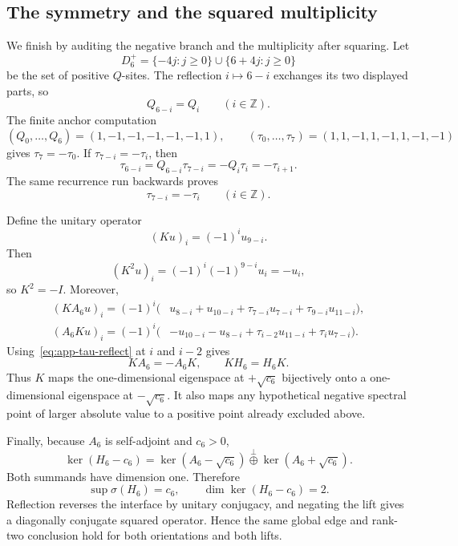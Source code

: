 \subsection{The symmetry and the squared multiplicity}
\label{appsubsec:g6-rank-two}

We finish by auditing the negative branch and the multiplicity after
squaring.  Let
\[
 D_6^{+}=\{-4j:j\geq0\}\cup\{6+4j:j\geq0\}
\]
be the set of positive \(Q\)-sites.  The reflection \(i\mapsto6-i\)
exchanges its two displayed parts, so
\begin{equation}
 Q_{6-i}=Q_i\qquad(i\in\mathbb Z).                    \label{eq:app-Q-reflect}
\end{equation}
The finite anchor computation
\[
 (Q_0,\ldots,Q_6)=(1,-1,-1,-1,-1,-1,1),\qquad
 (\tau_0,\ldots,\tau_7)=(1,1,-1,1,-1,1,-1,-1)
\]
gives \(\tau_7=-\tau_0\).  If \(\tau_{7-i}=-\tau_i\), then
\[
 \tau_{6-i}=Q_{6-i}\tau_{7-i}
 =-Q_i\tau_i=-\tau_{i+1}.
\]
The same recurrence run backwards proves
\begin{equation}
 \tau_{7-i}=-\tau_i\qquad(i\in\mathbb Z).             \label{eq:app-tau-reflect}
\end{equation}

Define the unitary operator
\[
 (Ku)_i=(-1)^iu_{9-i}.
\]
Then
\[
 (K^2u)_i=(-1)^i(-1)^{9-i}u_i=-u_i,
\]
so \(K^2=-I\).  Moreover,
\begin{align*}
(KA_6u)_i=(-1)^i\bigl(&u_{8-i}+u_{10-i}
 +\tau_{7-i}u_{7-i}+\tau_{9-i}u_{11-i}\bigr),\\
(A_6Ku)_i=(-1)^i\bigl(&-u_{10-i}-u_{8-i}
 +\tau_{i-2}u_{11-i}+\tau_i u_{7-i}\bigr).
\end{align*}
Using~\eqref{eq:app-tau-reflect} at \(i\) and \(i-2\) gives
\[
 KA_6=-A_6K,\qquad KH_6=H_6K.                         \label{eq:app-K-relations}
\]
Thus \(K\) maps the one-dimensional eigenspace at \(+\sqrt{c_6}\)
bijectively onto a one-dimensional eigenspace at \(-\sqrt{c_6}\).
It also maps any hypothetical negative spectral point of larger absolute
value to a positive point already excluded above.

Finally, because \(A_6\) is self-adjoint and \(c_6>0\),
\begin{equation}
 \ker(H_6-c_6)
 =\ker(A_6-\sqrt{c_6})
 \mathbin{\overset{\perp}{\oplus}}
 \ker(A_6+\sqrt{c_6}).                                \label{eq:app-rank-two}
\end{equation}
Both summands have dimension one.  Therefore
\[
 \sup\sigma(H_6)=c_6,\qquad
 \dim\ker(H_6-c_6)=2.
\]
Reflection reverses the interface by unitary conjugacy, and negating the
lift gives a diagonally conjugate squared operator.  Hence the same global
edge and rank-two conclusion hold for both orientations and both lifts.
